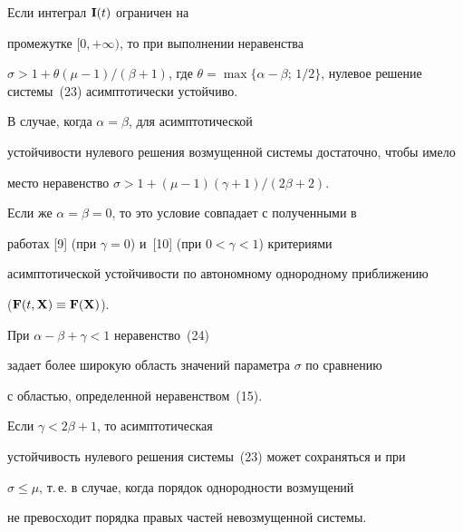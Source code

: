 \begin{cor}


Если интеграл $\bold I(t)$ ограничен на


промежутке $[0, +\infty)$, то при выполнении неравенства


$\sigma> 1+\theta (\mu-1)/(\beta+1)$, где $\theta=\max\{\alpha-\beta; \,


1/2 \}$, нулевое решение системы~(23) асимптотически устойчиво.


\end{cor}





\begin{cor}


В случае, когда $\alpha=\beta$, для асимптотической


устойчивости нулевого решения возмущенной системы достаточно, чтобы имело


место неравенство $\sigma> 1{+}(\mu{-}1)(\gamma{+}1)/(2\beta{+}2)$.


Если же $\alpha=\beta=0$, то это условие совпадает с полученными в


работах [9] (при $\gamma=0$) и~[10] (при $0<\gamma<1$) критериями


асимптотической устойчивости по автономному однородному приближению


($\bold F(t, \bold X)\equiv \bold F(\bold X)$).


\end{cor}





\begin{note}


При $\alpha-\beta+\gamma<1$ неравенство~(24)


задает более широкую область значений параметра $\sigma$ по сравнению


с областью, определенной неравенством~(15).


\end{note}





\begin{note}


Если $\gamma<2\beta+1$, то асимптотическая


устойчивость нулевого решения системы~(23) может сохраняться и при


$\sigma\leq \mu$, т.\,е. в случае, когда порядок однородности возмущений


не превосходит порядка правых частей невозмущенной системы.


\end{note}





